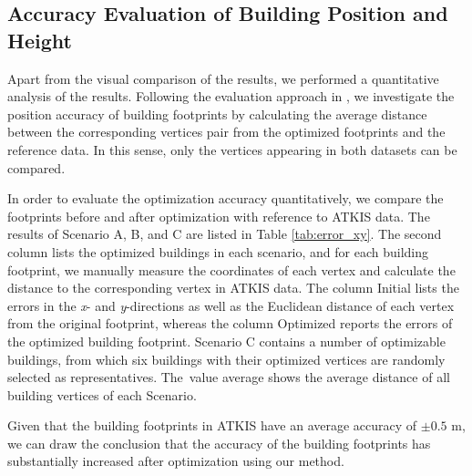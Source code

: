 \documentclass[remotesensing,article,accept,moreauthors,pdftex,10pt,a4paper]{mdpi}
\theoremstyle{mdpi}
\newcounter{ex}
\newcounter{re}
\begin{document}
\subsection{Accuracy Evaluation of Building Position and Height}
Apart from the visual comparison of the results, we performed a quantitative analysis of the results. Following the evaluation approach in \cite{fan2014quality}, we investigate the position accuracy of building footprints by calculating the average distance between the corresponding vertices pair from the optimized footprints and the reference data. In this sense, only the vertices appearing in both datasets can be compared.

In order to evaluate the optimization accuracy quantitatively, we compare the footprints before and after optimization with reference to ATKIS data. The results of Scenario A, B, and C are listed in Table \ref{tab:error_xy}. The second column lists the optimized buildings in each scenario, and for each building footprint, we manually measure the coordinates of each vertex and calculate the distance to the corresponding vertex in ATKIS data. The column Initial lists the errors in the \emph{x}- and \emph{y}-directions as well as the Euclidean distance of each vertex from the original footprint, whereas the column Optimized reports the errors of the optimized building footprint. Scenario C contains a number of optimizable buildings, from which six buildings with their optimized vertices are randomly selected as representatives. The~value average shows the average distance of all building vertices of each Scenario. 

Given that the building footprints in ATKIS have an average accuracy of $\pm{0.5}$ m, we can draw the conclusion that the accuracy of the building footprints has substantially increased after optimization using our method.
\end{document}

